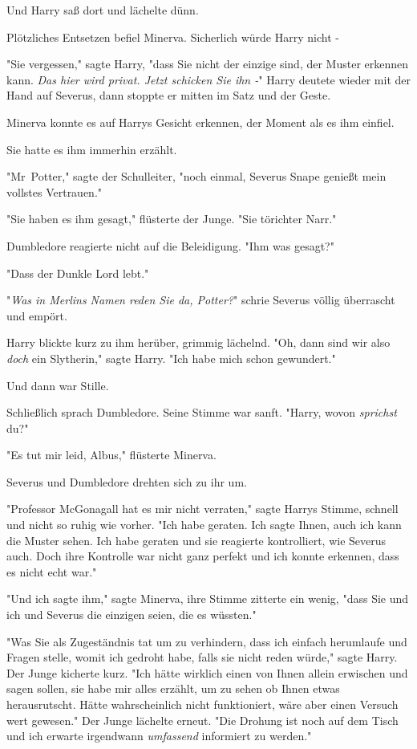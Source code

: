 {Und Harry saß dort und lächelte dünn.

Plötzliches Entsetzen befiel Minerva. Sicherlich würde Harry nicht -

"Sie vergessen," sagte Harry, "dass Sie nicht der einzige sind, der Muster erkennen kann. \emph{Das hier wird privat. Jetzt schicken Sie ihn -}" Harry deutete wieder mit der Hand auf Severus, dann stoppte er mitten im Satz und der Geste.

Minerva konnte es auf Harrys Gesicht erkennen, der Moment als es ihm einfiel.

Sie hatte es ihm immerhin erzählt.

"Mr~Potter," sagte der Schulleiter, "noch einmal, Severus Snape genießt mein vollstes Vertrauen."

"Sie haben es ihm gesagt," flüsterte der Junge. "Sie törichter Narr."

Dumbledore reagierte nicht auf die Beleidigung. "Ihm was gesagt?"

"Dass der Dunkle Lord lebt."

"\emph{Was in Merlins Namen reden Sie da, Potter?}" schrie Severus völlig überrascht und empört.

Harry blickte kurz zu ihm herüber, grimmig lächelnd. "Oh, dann sind wir also \emph{doch} ein Slytherin," sagte Harry. "Ich habe mich schon gewundert."

Und dann war Stille.

Schließlich sprach Dumbledore. Seine Stimme war sanft. "Harry, wovon \emph{sprichst} du?"

"Es tut mir leid, Albus," flüsterte Minerva.

Severus und Dumbledore drehten sich zu ihr um.

"Professor McGonagall hat es mir nicht verraten," sagte Harrys Stimme, schnell und nicht so ruhig wie vorher. "Ich habe geraten. Ich sagte Ihnen, auch ich kann die Muster sehen. Ich habe geraten und sie reagierte kontrolliert, wie Severus auch. Doch ihre Kontrolle war nicht ganz perfekt und ich konnte erkennen, dass es nicht echt war."

"Und ich sagte ihm," sagte Minerva, ihre Stimme zitterte ein wenig, "dass Sie und ich und Severus die einzigen seien, die es wüssten."

"Was Sie als Zugeständnis tat um zu verhindern, dass ich einfach herumlaufe und Fragen stelle, womit ich gedroht habe, falls sie nicht reden würde," sagte Harry. Der Junge kicherte kurz. "Ich hätte wirklich einen von Ihnen allein erwischen und sagen sollen, sie habe mir alles erzählt, um zu sehen ob Ihnen etwas herausrutscht. Hätte wahrscheinlich nicht funktioniert, wäre aber einen Versuch wert gewesen." Der Junge lächelte erneut. "Die Drohung ist noch auf dem Tisch und ich erwarte irgendwann \emph{umfassend} informiert zu werden."

}
